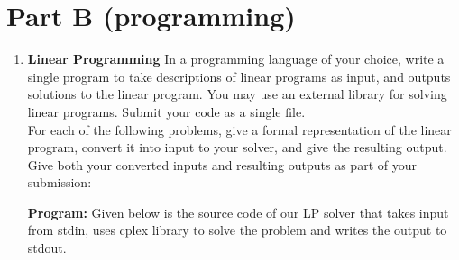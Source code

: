 \documentclass[12pt]{article}
\begin{document}
\section{Part B (programming)}
\begin{enumerate}
\item \textbf{Linear Programming} In a programming language of your choice, write a single program to take descriptions of linear programs as input, and outputs solutions to the linear program. You may use an external library for solving linear programs. Submit your code as a single file.\\
For each of the following problems, give a formal representation of the linear program, convert it into input to your solver, and give the resulting output. Give both your converted inputs and resulting outputs as part of your submission:

\textbf{Program:} Given below is the source code of our LP solver that takes input from stdin, uses cplex library to solve the problem and writes the output to stdout.\\


\end{enumerate}
\end{document}

